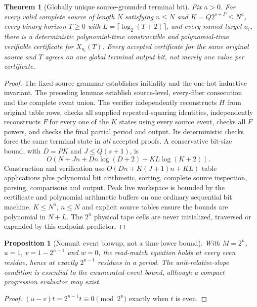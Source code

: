 \documentclass[11pt]{article}
\newtheorem{theorem}{Theorem}
\newtheorem{proposition}{Proposition}
\begin{document}
\begin{theorem}[Globally unique source-grounded terminal bit]
Fix $a>0$. For every valid complete source of length $N$ satisfying $n\le N$ and $K=Q2^{s+P}\le N^a$, every binary horizon $T\ge0$ with $L=\lceil\log_2(T+2)\rceil$, and every named target $a_i$, there is a deterministic polynomial-time constructible and polynomial-time verifiable certificate for $X_{a_i}(T)$. Every accepted certificate for the same original source and $T$ agrees on \emph{one global terminal output bit}, not merely one value per certificate.
\end{theorem}
\begin{proof}
The fixed source grammar establishes initiality and the one-hot inductive invariant. The preceding lemmas establish source-level, every-fiber consecution and the complete event union. The verifier independently reconstructs $H$ from original table rows, checks all supplied repeated-squaring identities, independently reconstructs $F$ for every one of the $K$ states using every source event, checks all $F$ powers, and checks the final partial period and output. Its deterministic checks force the same terminal state in \emph{all} accepted proofs. A conservative bit-size bound, with $D=PK$ and $J\le Q(s+1)$, is
\[
O\left(N+Jn+Dn\log(D+2)+KL\log(K+2)\right).
\]
Construction and verification use $O(Dn+K(J+1)n+KL)$ table applications plus polynomial bit arithmetic, sorting, complete source inspection, parsing, comparisons and output. Peak live workspace is bounded by the certificate and polynomial arithmetic buffers on one ordinary sequential bit machine. $K\le N^a$, $n\le N$ and explicit source tables ensure the bounds are polynomial in $N+L$. The $2^n$ physical tape cells are never initialized, traversed or expanded by this endpoint predictor.
\end{proof}

\begin{proposition}[Nonunit event blowup, not a time lower bound]
With $M=2^n$, $u=1$, $v=1-2^{n-1}$ and $w=0$, the read-match equation holds at every even residue, hence at exactly $2^{n-1}$ residues in a period. The unit-relative-slope condition is essential to the \emph{enumerated-event bound}, although a compact progression evaluator may exist.
\end{proposition}
\begin{proof}
$(u-v)t=2^{n-1}t\equiv0\pmod{2^n}$ exactly when $t$ is even.
\end{proof}
\end{document}
